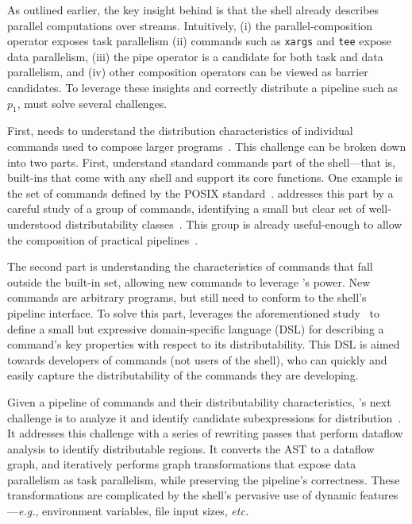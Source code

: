 \documentclass[sigplan,10pt,review,anonymous]{acmart}
\newcommand{\eg}{{\em e.g.}, }
\newcommand{\etc}{{\em etc.}\xspace}
\newcommand{\ttt}[1]{\texttt{\small #1}}
\newcommand{\nv}[1]{[{\color{cyan}#1 --- nv}]}
\newcommand{\kk}[1]{[{\color{magenta}#1 --- kk}]}
\begin{document}
As outlined earlier, the key insight behind \sys is that the shell already describes parallel computations over streams.
Intuitively,
 (i) the parallel-composition operator exposes task parallelism
 (ii) commands such as \ttt{xargs} and \ttt{tee} expose data parallelism,
 (iii) the pipe operator is a candidate for both task and data parallelism, and
 (iv)  other composition operators can be viewed as barrier candidates.
To leverage these insights and correctly distribute a pipeline such as $p_1$, \sys must solve several challenges.

First, \sys needs to understand the distribution characteristics of individual commands used to compose larger programs~.
This challenge can be broken down into two parts.
First, understand standard commands part of the shell---that is, built-ins that come with any shell and support its core functions.
One example is the set of commands defined by the \textsc{POSIX} standard~\cite{posix}.
\sys addresses this part by a careful study of a group of commands, identifying a small but clear set of well-understood distributability classes~.
This group is already useful-enough to allow the composition of practical pipelines~.

The second part is understanding the characteristics of commands that fall outside the built-in set, allowing new commands to leverage \sys's power.
New commands are arbitrary programs, but still need to conform to the shell's pipeline interface.
To solve this part, \sys leverages the aforementioned study~ to define a small but expressive domain-specific language (DSL) for describing a command's key properties with respect to its distributability.
This DSL is aimed towards developers of commands (not users of the shell), who can quickly and easily capture the distributability of the commands they are developing.

Given a pipeline of commands and their distributability characteristics, \sys's next challenge is to analyze it and identify candidate subexpressions for distribution~.
It addresses this challenge with a series of rewriting passes that perform dataflow analysis to identify distributable regions.
It converts the AST to a dataflow graph, and iteratively performs graph transformations that expose data parallelism as task parallelism, while preserving the pipeline's correctness.
These transformations are complicated by the shell's pervasive use of dynamic features---\eg environment variables, file input sizes, \etc
\end{document}

